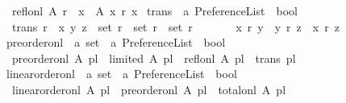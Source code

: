 \begin{isabellebody}
\ \ {\isachardoublequoteopen}refl{\isacharunderscore}{\kern0pt}on{\isacharunderscore}{\kern0pt}l\ A\ r\ {\isasymequiv}\ {\isasymforall}x\ {\isasymin}\ A{\isachardot}{\kern0pt}\ x\ {\isasymlesssim}\isactrlsub r\ x{\isachardoublequoteclose}\isanewline
\isanewline
{}\isamarkupfalse%
\ trans\ {\isacharcolon}{\kern0pt}{\isacharcolon}{\kern0pt}\ {\isachardoublequoteopen}{\isacharprime}{\kern0pt}a\ Preference{\isacharunderscore}{\kern0pt}List\ {\isasymRightarrow}\ bool{\isachardoublequoteclose}\ \ \isanewline
\ \ {\isachardoublequoteopen}trans\ r\ {\isasymequiv}\ {\isasymforall}{\isacharparenleft}{\kern0pt}x{\isacharcomma}{\kern0pt}\ y{\isacharcomma}{\kern0pt}\ z{\isacharparenright}{\kern0pt}\ {\isasymin}\ {\isacharparenleft}{\kern0pt}{\isacharparenleft}{\kern0pt}set\ r{\isacharparenright}{\kern0pt}\ {\isasymtimes}\ {\isacharparenleft}{\kern0pt}set\ r{\isacharparenright}{\kern0pt}\ {\isasymtimes}\ {\isacharparenleft}{\kern0pt}set\ r{\isacharparenright}{\kern0pt}{\isacharparenright}{\kern0pt}{\isachardot}{\kern0pt}\isanewline
\ \ \ \ \ \ \ x\ {\isasymlesssim}\isactrlsub r\ y\ {\isasymand}\ y\ {\isasymlesssim}\isactrlsub r\ z\ {\isasymlongrightarrow}\ x\ {\isasymlesssim}\isactrlsub r\ z{\isachardoublequoteclose}\isanewline
\isanewline
{}\isamarkupfalse%
\ preorder{\isacharunderscore}{\kern0pt}on{\isacharunderscore}{\kern0pt}l\ {\isacharcolon}{\kern0pt}{\isacharcolon}{\kern0pt}\ {\isachardoublequoteopen}{\isacharprime}{\kern0pt}a\ set\ {\isasymRightarrow}\ {\isacharprime}{\kern0pt}a\ Preference{\isacharunderscore}{\kern0pt}List\ {\isasymRightarrow}\ bool{\isachardoublequoteclose}\ \isanewline
\ \ {\isachardoublequoteopen}preorder{\isacharunderscore}{\kern0pt}on{\isacharunderscore}{\kern0pt}l\ A\ pl\ {\isasymequiv}\ limited\ A\ pl\ {\isasymand}\ refl{\isacharunderscore}{\kern0pt}on{\isacharunderscore}{\kern0pt}l\ A\ pl\ {\isasymand}\ trans\ pl{\isachardoublequoteclose}\isanewline
\isanewline
{}\isamarkupfalse%
\ linear{\isacharunderscore}{\kern0pt}order{\isacharunderscore}{\kern0pt}on{\isacharunderscore}{\kern0pt}l\ {\isacharcolon}{\kern0pt}{\isacharcolon}{\kern0pt}\ {\isachardoublequoteopen}{\isacharprime}{\kern0pt}a\ set\ {\isasymRightarrow}\ {\isacharprime}{\kern0pt}a\ Preference{\isacharunderscore}{\kern0pt}List\ {\isasymRightarrow}\ bool{\isachardoublequoteclose}\ \isanewline
\ \ {\isachardoublequoteopen}linear{\isacharunderscore}{\kern0pt}order{\isacharunderscore}{\kern0pt}on{\isacharunderscore}{\kern0pt}l\ A\ pl\ {\isasymequiv}\ preorder{\isacharunderscore}{\kern0pt}on{\isacharunderscore}{\kern0pt}l\ A\ pl\ {\isasymand}\ total{\isacharunderscore}{\kern0pt}on{\isacharunderscore}{\kern0pt}l\ A\ pl{\isachardoublequoteclose}\isanewline

\end{isabellebody}
